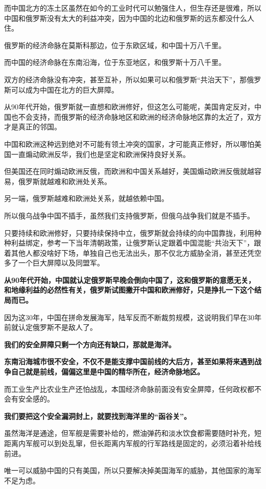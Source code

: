 \documentclass[UTF8, 11pt, oneside]{ctexart}
\newcommand{\zd}[1]{\textbf{\textcolor[RGB]{123,12,0}{#1}}} %
\begin{document}
而中国北方的冻土区虽然在如今的工业时代可以勉强住人，但生存还是很难，所以中国和俄罗斯没有太大的利益冲突，因为中国的北边和俄罗斯的远东都没什么人住。

俄罗斯的经济命脉在莫斯科那边，位于东欧区域，和中国十万八千里。

而中国的经济命脉在东南沿海，位于东亚地区，和俄罗斯十万八千里。

双方的经济命脉没有冲突，甚至互补，所以如果可以和俄罗斯“共治天下”，那俄罗斯可以成为中国在北方的巨大屏障。

从90年代开始，俄罗斯就一直想和欧洲修好，但这怎么可能呢，美国肯定反对，中国也不会支持，而俄罗斯的经济命脉地区和欧洲的经济命脉地区靠的太近了，双方才是真正的邻国。

中国和欧洲这种远到绝对不可能有领土冲突的国家，才可能真正修好，所以哪怕美国一直煽动欧洲反华，我们也是坚定和欧洲保持良好关系。

但美国还在同时煽动欧洲反俄，而欧洲和中国关系越好，美国煽动欧洲反俄就越容易，俄罗斯就越难和欧洲处关系。

另一端，俄罗斯越难和欧洲处关系，就越依赖中国。

所以俄乌战争中国不插手，虽然我们支持俄罗斯，但俄乌战争我们就是不插手。

只要持续和欧洲修好，只要持续保持中立，俄罗斯就会持续的向中国靠拢，利用种种利益绑定，参考一下当年清朝政策，让俄罗斯认定跟着中国混能“共治天下”，跟着其他人都没啥好下场，单独自己也无法出头，那不仅北方威胁全消，甚至还凭空多了一个巨大屏障以及同盟军。

\zd{从90年代开始，中国就认定俄罗斯早晚会倒向中国了，这和俄罗斯的意愿无关，和地缘利益的必然性有关，俄罗斯试图撇开中国和欧洲修好，只是挣扎一下这个结局而已。}

因为这30年，中国在拼命发展海军，陆军反而不断裁剪规模，这说明我们早在30年前就认定俄罗斯不是敌人了。

\zd{我们的安全屏障只剩一个方向还有缺口，那就是海洋。}

\zd{东南沿海城市很不安全，不仅不是能支撑中国前线的大后方，甚至如果将来遇到战争自己就是前线，偏偏这里是中国的精华所在，经济命脉地区。}

而工业生产比农业生产还怕战乱，本国经济命脉前面没有安全屏障，任何政权都不会有安全感的。

\zd{我们要把这个安全漏洞封上，就要找到海洋里的“函谷关”。}

虽然海洋是通途，但军舰是需要补给的，燃油弹药和淡水饮食都需要随时补充，短距离内军舰可以到处乱窜，但长距离内军舰的行军路线是固定的，必须沿着补给线前进。

唯一可以威胁中国的只有美国，所以只要解决掉美国海军的威胁，其他国家的海军不足为虑。
\end{document}
